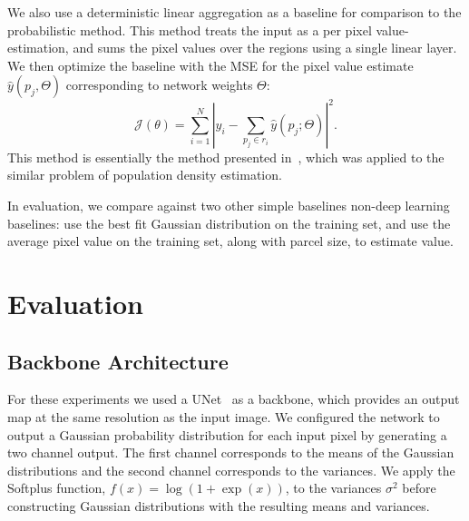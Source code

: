 \documentclass[10pt,twocolumn,letterpaper]{article}
\begin{document}
We also use a deterministic linear aggregation as a baseline for comparison to the probabilistic method. This method treats the input as a per pixel value-estimation, and sums the pixel values over the regions using a single linear layer. We then optimize the baseline with the MSE for the pixel value estimate $\hat{y}(p_j, \Theta)$ corresponding to network weights $\Theta$:
\begin{equation}
\mathcal{J}(\theta) = \sum_{i=1}^{N}\left|y_i -\sum_{p_j\in r_i}\hat{y}( p_j; \Theta) \right|^2.
\end{equation}
This method is essentially the method presented in~\cite{jacobs2018weakly}, which was applied to the similar problem of population density estimation.

In evaluation, we compare against two other simple baselines non-deep learning baselines: use the best fit Gaussian distribution on the training set, and use the average pixel value on the training set, along with parcel size, to estimate value.


\section{Evaluation}
\label{sec:evaluation}

\subsection{Backbone Architecture}
    For these experiments we used a UNet~\cite{ronneberger2015u} as a backbone, which provides an output map at the same resolution as the input image. We configured the network to output a Gaussian probability distribution for each input pixel by generating a two channel output. The first channel corresponds to the means of the Gaussian distributions and the second channel corresponds to the variances. We apply the Softplus function, $f(x) = \log(1+ \exp{(x)})$, to the variances $\sigma^2$ before constructing Gaussian distributions with the resulting means and variances.




\end{document}
